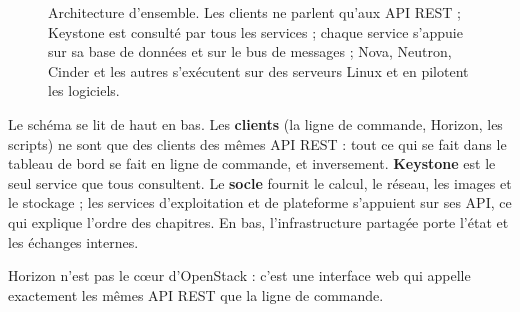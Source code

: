 \begin{figure}[!ht]
{}
\caption{Architecture d'ensemble. Les clients ne parlent qu'aux API REST ; Keystone est consulté par tous les services ; chaque
service s'appuie sur sa base de données et sur le bus de messages ; Nova, Neutron, Cinder et les autres s'exécutent sur des
serveurs Linux et en pilotent les logiciels.}
\label{fig:pres-archi}
\end{figure}

Le schéma se lit de haut en bas. Les \textbf{clients} (la ligne de commande, Horizon, les scripts) ne sont que des clients des
mêmes API REST : tout ce qui se fait dans le tableau de bord se fait en ligne de commande, et inversement. \textbf{Keystone} est le
seul service que tous consultent. Le \textbf{socle} fournit le calcul, le réseau, les images et le stockage ; les services
d'exploitation et de plateforme s'appuient sur ses API, ce qui explique l'ordre des chapitres. En bas, l'infrastructure
partagée porte l'état et les échanges internes.

\begin{pointcle}
Horizon n'est pas le cœur d'OpenStack : c'est une interface web qui appelle exactement les mêmes API REST que la ligne de commande.
\end{pointcle}

